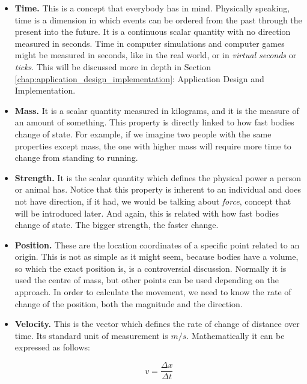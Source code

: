 \begin{itemize}

\item{{\bf Time.} This is a concept that everybody has in mind. Physically speaking, time is a dimension in which events can be ordered from the past through the present into the future. It is a continuous scalar quantity with no direction measured in seconds. Time in computer simulations and computer games might be measured in seconds, like in the real world, or in \emph{virtual seconds} or \emph{ticks}. This will be discussed more in depth in Section \ref{chap:application_design_implementation}: Application Design and Implementation.}

\item{{\bf Mass.} It is a scalar quantity measured in kilograms, and it is the measure of an amount of something. This property is directly linked to how fast bodies change of state. For example, if we imagine two people with the same properties except mass, the one with higher mass will require more time to change from standing to running.}

\item{{\bf Strength.} It is the scalar quantity which defines the physical power a person or animal has. Notice that this property is inherent to an individual and does not have direction, if it had, we would be talking about \emph{force}, concept that will be introduced later. And again, this is related with how fast bodies change of state. The bigger strength, the faster change.}

\item{{\bf Position.} These are the location coordinates of a specific point related to an origin. This is not as simple as it might seem, because bodies have a volume, so which the exact position is, is a controversial discussion. Normally it is used the centre of mass, but other points can be used depending on the approach. In order to calculate the movement, we need to know the rate of change of the position, both the magnitude and the direction.}

\item{{\bf Velocity.} This is the vector which defines the rate of change of distance over time. Its standard unit of measurement is $m/s$. Mathematically it can be expressed as follows:}

\begin{equation}
  v=\frac{\Delta x}{\Delta t}
\end{equation}


\end{itemize}
